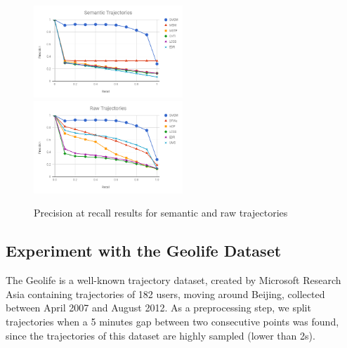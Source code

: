 \documentclass[12pt]{article}
\begin{document}
\begin{figure}[ht!]
\centering
\centerline{
\includegraphics[width=0.5\textwidth]{Images/new_P_R-chart_San_Francisco.png}
\includegraphics[width=0.5\textwidth]{Images/new_P_R-chart_San_Francisco-raw.png}
}
\caption{ Precision at recall results for semantic and raw trajectories}
\label{fig:new_sanfrancisco_precision_recall}
\end{figure}





\subsection{Experiment with the Geolife Dataset}\label{sec:geolife}

The Geolife is a well-known trajectory dataset, created by Microsoft Research Asia \citep{zheng2009mining} containing trajectories of 182 users, moving around Beijing, collected between April 2007 and August 2012. As a preprocessing step, we split trajectories when a 5 minutes gap between two consecutive points was found, since the trajectories of this dataset are highly sampled (lower than 2s).
\end{document}

